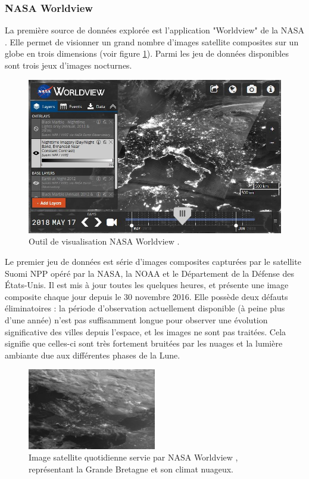 \documentclass[a4paper, 11pt]{report}
\begin{document}
\subsubsection{NASA Worldview}
La première source de données explorée est l'application "Worldview" de la NASA \cite{nasa-worldview}. Elle permet de visionner un grand nombre d'images satellite composites sur un globe en trois dimensions (voir figure \ref{nasa-worldview-screenshot}). Parmi les jeu de données disponibles sont trois jeux d'images nocturnes.

\begin{figure}[h]
	\centering
	\includegraphics[width=1.0\textwidth]{img/worldview.JPG}
	\caption{Outil de visualisation NASA Worldview \cite{nasa-worldview}.}
	\label{nasa-worldview-screenshot}
\end{figure}

Le premier jeu de données est série d'images composites capturées par le satellite Suomi NPP opéré par la NASA, la NOAA et le Département de la Défense des États-Unis. Il est mis à jour toutes les quelques heures, et présente une image composite chaque jour depuis le 30 novembre 2016. Elle possède deux défauts éliminatoires : la période d'observation actuellement disponible (à peine plus d'une année) n'est pas suffisamment longue pour observer une évolution significative des villes depuis l'espace, et les images ne sont pas traitées. Cela signifie que celles-ci sont très fortement bruitées par les nuages et la lumière ambiante due aux différentes phases de la Lune.

\begin{figure}[h]
	\centering
	\includegraphics[width=0.5\textwidth]{img/worldview_clouds.JPG}
	\caption{Image satellite quotidienne servie par NASA Worldview \cite{nasa-worldview}, représentant la Grande Bretagne et son climat nuageux.}
	\label{nasa-worldview-daily}
\end{figure}
\end{document}

